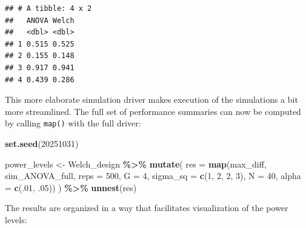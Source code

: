 \documentclass[
]{book}
\newenvironment{Shaded}{\begin{snugshade}}{\end{snugshade}}
\newcommand{\AttributeTok}[1]{\textcolor[rgb]{0.13,0.29,0.53}{#1}}
\newcommand{\DecValTok}[1]{\textcolor[rgb]{0.00,0.00,0.81}{#1}}
\newcommand{\FunctionTok}[1]{\textcolor[rgb]{0.13,0.29,0.53}{\textbf{#1}}}
\newcommand{\NormalTok}[1]{#1}
\newcommand{\OtherTok}[1]{\textcolor[rgb]{0.56,0.35,0.01}{#1}}
\newcommand{\SpecialCharTok}[1]{\textcolor[rgb]{0.81,0.36,0.00}{\textbf{#1}}}
\begin{document}
\begin{verbatim}
## # A tibble: 4 x 2
##   ANOVA Welch
##   <dbl> <dbl>
## 1 0.515 0.525
## 2 0.155 0.148
## 3 0.917 0.941
## 4 0.439 0.286
\end{verbatim}

This more elaborate simulation driver makes execution of the simulations a bit more streamlined.
The full set of performance summaries can now be computed by calling \texttt{map()} with the full driver:

\begin{Shaded}
\begin{Highlighting}[]
\FunctionTok{set.seed}\NormalTok{(}\DecValTok{20251031}\NormalTok{)}

\NormalTok{power\_levels }\OtherTok{\textless{}{-}} 
\NormalTok{  Welch\_design }\SpecialCharTok{\%\textgreater{}\%}
  \FunctionTok{mutate}\NormalTok{(}
    \AttributeTok{res =} \FunctionTok{map}\NormalTok{(max\_diff, sim\_ANOVA\_full, }\AttributeTok{reps =} \DecValTok{500}\NormalTok{, }\AttributeTok{G =} \DecValTok{4}\NormalTok{, }
                \AttributeTok{sigma\_sq =} \FunctionTok{c}\NormalTok{(}\DecValTok{1}\NormalTok{, }\DecValTok{2}\NormalTok{, }\DecValTok{2}\NormalTok{, }\DecValTok{3}\NormalTok{), }\AttributeTok{N =} \DecValTok{40}\NormalTok{,}
                \AttributeTok{alpha =} \FunctionTok{c}\NormalTok{(.}\DecValTok{01}\NormalTok{, .}\DecValTok{05}\NormalTok{))}
\NormalTok{  ) }\SpecialCharTok{\%\textgreater{}\%}
  \FunctionTok{unnest}\NormalTok{(res)}
\end{Highlighting}
\end{Shaded}

The results are organized in a way that facilitates visualization of the power levels:
\end{document}
